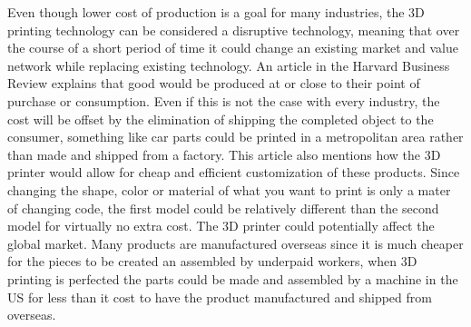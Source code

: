 \documentclass[pdftex,10.5pt]{report}
\begin{document}
 Even though lower cost of production is a goal for many industries, the 3D printing technology can be considered a disruptive technology, meaning that over the course of a short period of time it could change an existing market and value network while replacing existing technology. An article in the Harvard Business Review explains that good would be produced at or close to their point of purchase or consumption. Even if this is not the case with every industry, the cost will be offset by the elimination of shipping the completed object to the consumer, something like car parts could be printed in a metropolitan area rather than made and shipped from a factory. This article also mentions how the 3D printer would allow for cheap and efficient customization of these products. Since changing the shape, color or material of what you want to print is only a mater of changing code, the first model could be relatively different than the second model for virtually no extra cost. \cite{cite6} The 3D printer could potentially affect the global market. Many products are manufactured overseas since it is much cheaper for the pieces to be created an assembled by underpaid workers, when 3D printing is perfected the parts could be made and assembled by a machine in the US for less than it cost to have the product manufactured and shipped from overseas. 
\end{document}
